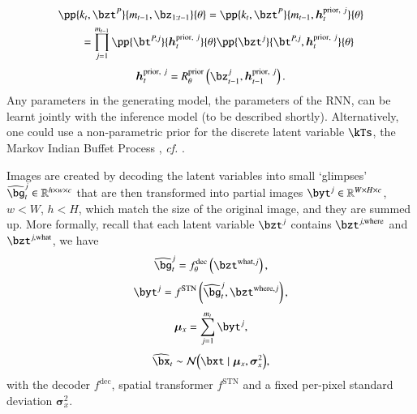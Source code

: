 \begin{equation}
\begin{aligned}
    &\pp{k_t, \bzt^P}{m_{t-1}, \bz_{1:t-1}}{\theta} = 
    \pp{k_t, \bzt^P}{m_{t-1}, \bm{h}_t^{\mathrm{prior},\ j}}{\theta}\\
%    
    &\qquad= \prod_{j=1}^{m_{t-1}} \pp{\bt^{P, j}}{\bm{h}_t^{\mathrm{prior},\ j}}{\theta} \pp{\bzt^j}{ \bt^{P, j}, \bm{h}_t^{\mathrm{prior},\ j}}{\theta}
\end{aligned}
\end{equation}
\begin{equation}
    \bm{h}_t^{\mathrm{prior},\ j} = R_\theta^\mathrm{prior} \left( \bz_{t-1}^j, \bm{h}_{t-1}^{\mathrm{prior},\ j} \right).
\end{equation}
Any parameters in the generating model, \eg the parameters of the RNN, can be learnt jointly with the inference model (to be described shortly).
Alternatively, one could use a non-parametric prior for the discrete latent variable $\kTs$, \eg the Markov Indian Buffet Process \citep{Gael2009}, \emph{cf.} . 

Images are created by decoding the latent variables into small `glimpses' $\widehat{\bg}_t^j \in \RR^{h \times w \times c}$ that are then transformed into partial images $\byt^j \in \RR^{W \times H \times c}$, $w < W$, $h < H$, which match the size of the original image, and they are summed up. More formally, recall that each latent variable $\bzt^j$ contains $\bzt^{j, \mathrm{where}}$ and  $\bzt^{j, \mathrm{what}}$, we have
\begin{equation}
    \widehat{\bg}_t^j = f^{\mathrm{dec}}_\theta \left( \bzt^{\mathrm{what}, j} \right),
\end{equation}
\begin{equation}
    \byt^j = f^{\mathrm{STN}} \left( \widehat{\bg}_t^j, \bzt^{\mathrm{where}, j} \right),
\end{equation}
\begin{equation}
    \bm{\mu}_x = \sum_{j=1}^{m_t} \byt^j,
\end{equation}
\begin{equation}
    \widehat{\bx}_t \sim \gauss{ \bxt \mid \bm{\mu}_x, \bm{\sigma}_x^2},
\end{equation}
with the decoder $f^{\mathrm{dec}}$, spatial transformer $f^{\mathrm{STN}}$ and a fixed per-pixel standard deviation $\bm{\sigma}_x^2$.

